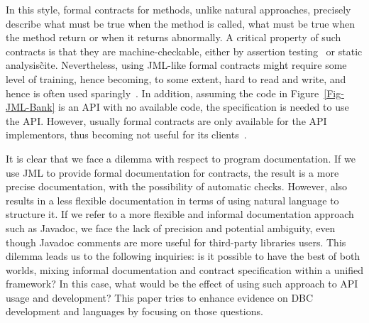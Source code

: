 In this style, formal contracts for methods, unlike natural approaches, precisely describe what must be true when the method is called, what must be true when the method return or when it returns abnormally. A critical property of such contracts is that they are machine-checkable, either by assertion testing~\cite{} or static analysis\~cite{}.
Nevertheless, using JML-like formal contracts might require some level of training, hence becoming, to some extent, hard to read and write, and hence is often used sparingly~\cite{Chalin06,Polikarpova-etal09,typeContracts}.
In addition, assuming the code in Figure~\ref{Fig-JML-Bank} is an API with no available code, the specification is needed to use the API. However, usually formal contracts are only available for the API implementors, thus becoming not useful for its clients~\cite{Parnas2011}.


It is clear that we face a dilemma with respect to program documentation. If we use JML to provide formal documentation for contracts, the result is a more precise documentation, with the possibility of automatic checks. However, also results in a less flexible documentation in terms of using natural language to structure it.
If we refer to a more flexible and informal documentation approach such as Javadoc, we face the lack of precision and potential ambiguity, even though Javadoc comments are more useful for third-party libraries users. This dilemma leads us to the following  inquiries: is it possible to have the best of both worlds, mixing informal documentation and contract specification within a unified framework? In this case, what would be the effect of using such approach to API usage and development? This paper tries to enhance evidence on DBC development and languages by focusing on those questions.

